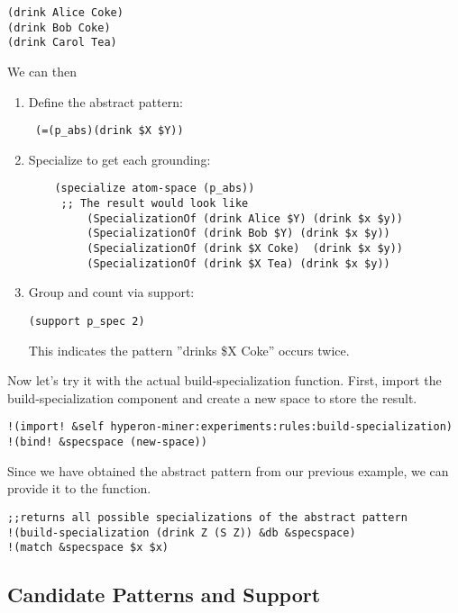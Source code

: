\documentclass{article}
\begin{document}
\begin{verbatim}
(drink Alice Coke)
(drink Bob Coke)
(drink Carol Tea)
\end{verbatim}

We can then

\begin{enumerate}
\item  Define the abstract pattern:
    \begin{verbatim}
 (=(p_abs)(drink $X $Y))
    \end{verbatim}
\item  Specialize to get each grounding:
    \begin{verbatim}
    (specialize atom-space (p_abs))
     ;; The result would look like 
         (SpecializationOf (drink Alice $Y) (drink $x $y))
         (SpecializationOf (drink Bob $Y) (drink $x $y))
         (SpecializationOf (drink $X Coke)  (drink $x $y))
         (SpecializationOf (drink $X Tea) (drink $x $y))
    \end{verbatim}
\item   Group and count via support:
    \begin{verbatim}
(support p_spec 2)
    \end{verbatim}
    This indicates the pattern ''drinks \$X  Coke'' occurs twice.
\end{enumerate}

Now let's try it with the actual build-specialization function.
First, import the build-specialization component and create a new space to store the result.

 \begin{verbatim}
!(import! &self hyperon-miner:experiments:rules:build-specialization)
!(bind! &specspace (new-space))
  \end{verbatim}

Since we have obtained the abstract pattern from our previous example, we can provide it  to the function.

 \begin{verbatim}
;;returns all possible specializations of the abstract pattern
!(build-specialization (drink Z (S Z)) &db &specspace)
!(match &specspace $x $x)
  \end{verbatim}



\subsection{Candidate Patterns and Support}
\end{document}
